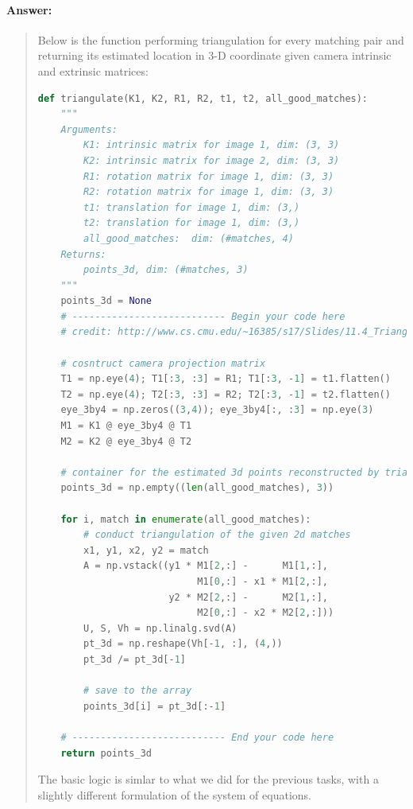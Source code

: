 \documentclass[11pt]{article}
\begin{document}
\paragraph{Answer:} 
\begin{quote}

Below is the function performing triangulation for every matching pair and returning its estimated location in 3-D coordinate given camera intrinsic and extrinsic matrices:

\begin{lstlisting}[language=Python, basicstyle=\scriptsize]
def triangulate(K1, K2, R1, R2, t1, t2, all_good_matches):
    """
    Arguments:
        K1: intrinsic matrix for image 1, dim: (3, 3)
        K2: intrinsic matrix for image 2, dim: (3, 3)
        R1: rotation matrix for image 1, dim: (3, 3)
        R2: rotation matrix for image 1, dim: (3, 3)
        t1: translation for image 1, dim: (3,)
        t2: translation for image 1, dim: (3,)
        all_good_matches:  dim: (#matches, 4)
    Returns:
        points_3d, dim: (#matches, 3)
    """
    points_3d = None
    # --------------------------- Begin your code here
    # credit: http://www.cs.cmu.edu/~16385/s17/Slides/11.4_Triangulation.pdf

    # cosntruct camera projection matrix
    T1 = np.eye(4); T1[:3, :3] = R1; T1[:3, -1] = t1.flatten()
    T2 = np.eye(4); T2[:3, :3] = R2; T2[:3, -1] = t2.flatten()
    eye_3by4 = np.zeros((3,4)); eye_3by4[:, :3] = np.eye(3)
    M1 = K1 @ eye_3by4 @ T1
    M2 = K2 @ eye_3by4 @ T2

    # container for the estimated 3d points reconstructed by triangulation
    points_3d = np.empty((len(all_good_matches), 3))
    
    for i, match in enumerate(all_good_matches):
        # conduct triangulation of the given 2d matches
        x1, y1, x2, y2 = match
        A = np.vstack((y1 * M1[2,:] -      M1[1,:],
                            M1[0,:] - x1 * M1[2,:],
                       y2 * M2[2,:] -      M2[1,:],
                            M2[0,:] - x2 * M2[2,:]))
        U, S, Vh = np.linalg.svd(A)
        pt_3d = np.reshape(Vh[-1, :], (4,))
        pt_3d /= pt_3d[-1]

        # save to the array
        points_3d[i] = pt_3d[:-1]

    # --------------------------- End your code here
    return points_3d
\end{lstlisting}

The basic logic is simlar to what we did for the previous tasks, with a slightly different formulation of the system of equations.


\end{quote}
\end{document}
